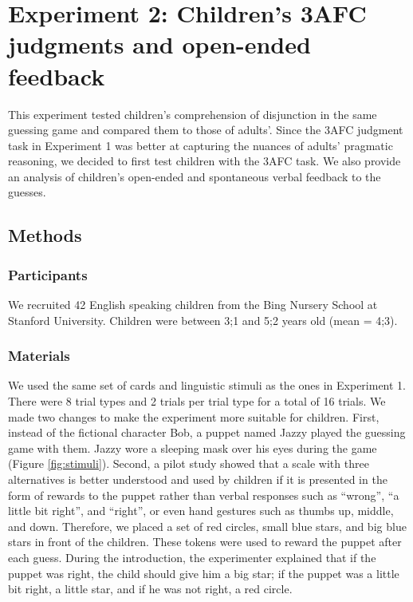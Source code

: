 \documentclass[,man,floatsintext]{apa6}
\begin{document}
\hypertarget{study2}{%
\section{Experiment 2: Children's 3AFC judgments and open-ended feedback}\label{study2}}

This experiment tested children's comprehension of disjunction in the same guessing game and compared them to those of adults'. Since the 3AFC judgment task in Experiment 1 was better at capturing the nuances of adults' pragmatic reasoning, we decided to first test children with the 3AFC task. We also provide an analysis of children's open-ended and spontaneous verbal feedback to the guesses.

\hypertarget{methods-1}{%
\subsection{Methods}\label{methods-1}}

\hypertarget{participants-1}{%
\subsubsection{Participants}\label{participants-1}}

We recruited 42 English speaking children from the Bing Nursery School at Stanford University. Children were between 3;1 and 5;2 years old (mean = 4;3).

\hypertarget{materials}{%
\subsubsection{Materials}\label{materials}}

We used the same set of cards and linguistic stimuli as the ones in Experiment 1. There were 8 trial types and 2 trials per trial type for a total of 16 trials. We made two changes to make the experiment more suitable for children. First, instead of the fictional character Bob, a puppet named Jazzy played the guessing game with them. Jazzy wore a sleeping mask over his eyes during the game (Figure \ref{fig:stimuli}). Second, a pilot study showed that a scale with three alternatives is better understood and used by children if it is presented in the form of rewards to the puppet rather than verbal responses such as \enquote{wrong}, \enquote{a little bit right}, and \enquote{right}, or even hand gestures such as thumbs up, middle, and down. Therefore, we placed a set of red circles, small blue stars, and big blue stars in front of the children. These tokens were used to reward the puppet after each guess. During the introduction, the experimenter explained that if the puppet was right, the child should give him a big star; if the puppet was a little bit right, a little star, and if he was not right, a red circle.
\end{document}

